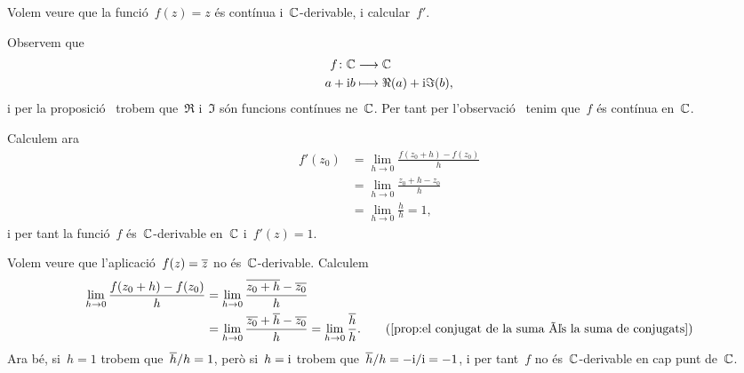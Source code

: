 \documentclass[../Apunts.tex]{subfiles}
\begin{document}
	\begin{example}
	Volem veure que la funció~\(f(z)=z\) és contínua i~\(\mathbb{C}\)-derivable, i calcular~\(f'\).
	\end{example}
	\begin{solution}
		Observem que
		\begin{align*}
			f\colon\mathbb{C}&\longrightarrow\mathbb{C} \\
			a+\mathrm{i} b&\longmapsto \Re(a)+\mathrm{i}\Im(b),
		\end{align*}
		i per la proposició~ trobem que~\(\Re\) i~\(\Im\) són funcions contínues ne~\(\mathbb{C}\). Per tant per l'observació~ tenim que~\(f\) és contínua en~\(\mathbb{C}\).
		
		Calculem ara
		\begin{align*}
			f'(z_{0})&=\lim_{h\to0}\frac{f(z_{0}+h)-f(z_{0})}{h} \\
			&=\lim_{h\to0}\frac{z_{0}+h-z_{0}}{h} \\
			&=\lim_{h\to0}\frac{h}{h}=1,
		\end{align*}
		i per tant la funció~\(f\) és~\(\mathbb{C}\)-derivable en~\(\mathbb{C}\) i~\(f'(z)=1\).
	\end{solution}
	\begin{example}
		Volem veure que l'aplicació~\(f(z)=\overline{z}\) no és~\(\mathbb{C}\)-derivable. Calculem
		\begin{align*}
			\lim_{h\to0}\frac{f(z_{0}+h)-f(z_{0})}{h}&=\lim_{h\to0}\frac{\conjugat{z_{0}+h}-\conjugat{z_{0}}}{h} \\
			&=\lim_{h\to0}\frac{\conjugat{z_{0}}+\conjugat{h}-\conjugat{z_{0}}}{h}=\lim_{h\to0}\frac{\conjugat{h}}{h}. \tag{\ref{prop:el conjugat de la suma és la suma de conjugats}}
		\end{align*}
		Ara bé, si~\(h=1\) trobem que~\(\overline{h}/h=1\), però si~\(h=\mathrm{i}\) trobem que~\(\overline{h}/h=-\mathrm{i}/\mathrm{i}=-1\), i per tant~\(f\) no és~\(\mathbb{C}\)-derivable en cap punt de~\(\mathbb{C}\).
	\end{example}
\end{document}
